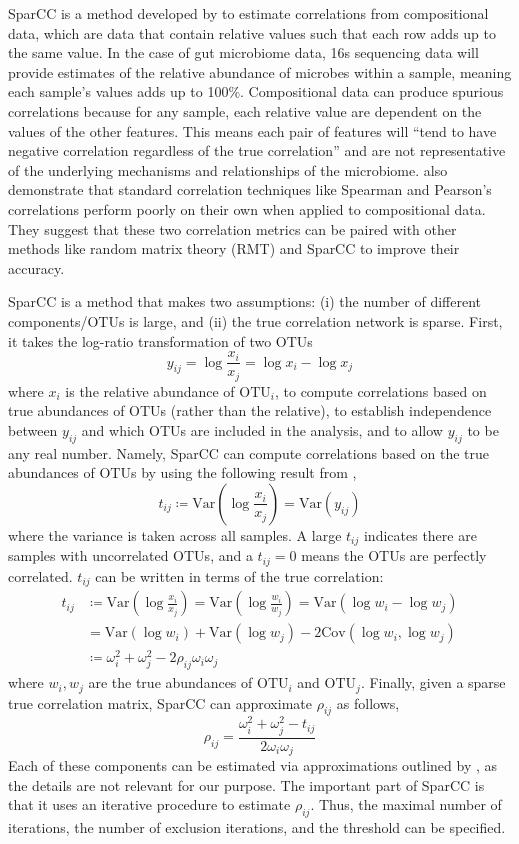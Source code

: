 \documentclass[12pt,letterpaper]{article}
\begin{document}
SparCC is a method developed by \citep{friedman2012sparcc} to estimate correlations from compositional data, which are data that contain relative values such that each row adds up to the same value. In the case of gut microbiome data, 16s sequencing data will provide estimates of the relative abundance of microbes within a sample, meaning each sample’s values adds up to 100\%. Compositional data can produce spurious correlations because for any sample, each relative value are dependent on the values of the other features. This means each pair of features will “tend to have negative correlation regardless of the true correlation” and are not representative of the underlying mechanisms and relationships of the microbiome. \citep{weiss2016correlationbenchmark} also demonstrate that standard correlation techniques like Spearman and Pearson’s correlations perform poorly on their own when applied to compositional data. They suggest that these two correlation metrics can be paired with other methods like random matrix theory (RMT) and SparCC to improve their accuracy. 

SparCC is a method that makes two assumptions: (i) the number of different components/OTUs is large, and (ii) the true correlation network is sparse. First, it takes the log-ratio transformation of two OTUs $$y_{ij} = \log \frac{x_i}{x_j} = \log x_i - \log x_j$$ where $x_i$ is the relative abundance of $\text{OTU}_i$, to compute correlations based on true abundances of OTUs (rather than the relative), to establish independence between $y_{ij}$ and which OTUs are included in the analysis, and to allow $y_{ij}$ to be any real number. Namely, SparCC can compute correlations based on the true abundances of OTUs by using the following result from \citep{aitchison1982compositional}, $$t_{ij} \coloneq \text{Var}\left(\log \frac{x_i}{x_j}\right) = \text{Var} (y_{ij})$$ where the variance is taken across all samples. A large $t_{ij}$ indicates there are samples with uncorrelated OTUs, and a $t_{ij} = 0$ means the OTUs are perfectly correlated. $t_{ij}$ can be written in terms of the true correlation: 
\begin{align*}
	t_{ij} &\coloneq \text{Var}\left(\log \frac{x_i}{x_j}\right) = \text{Var}\left(\log \frac{w_i}{w_j}\right) = \text{Var} (\log w_i - \log w_j) \\
	&= \text{Var} (\log w_i) + \text{Var} (\log w_j) - 2 \text{Cov}(\log w_i, \log w_j) \\
	&\coloneq \omega_i^2 + \omega_j^2 - 2 \rho_{ij}\omega_i\omega_j
\end{align*}
where $w_i, w_j$ are the true abundances of $\text{OTU}_i$ and $\text{OTU}_j$. Finally, given a sparse true correlation matrix, SparCC can approximate $\rho_{ij}$ as follows, $$\rho_{ij} = \frac{\omega_i^2 + \omega_j^2 - t_{ij}}{2\omega_i\omega_j}$$ Each of these components can be estimated via approximations outlined by \citep{friedman2012sparcc}, as the details are not relevant for our purpose. The important part of SparCC is that it uses an iterative procedure to estimate $\rho_{ij}$. Thus, the maximal number of iterations, the number of exclusion iterations, and the threshold can be specified.
\end{document}

